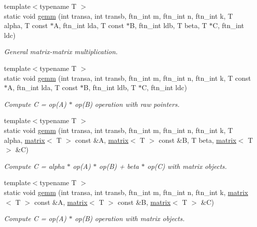 \begin{DoxyCompactItemize}
\item 
{\footnotesize template$<$typename T $>$ }\\static void \hyperlink{classsddk_1_1linalg_3_01_c_p_u_01_4_a3e069c2b48dc2a783443cb91e82efab3}{gemm} (int transa, int transb, ftn\+\_\+int m, ftn\+\_\+int n, ftn\+\_\+int k, T alpha, T const $\ast$A, ftn\+\_\+int lda, T const $\ast$B, ftn\+\_\+int ldb, T beta, T $\ast$C, ftn\+\_\+int ldc)
\begin{DoxyCompactList}\small\item\em General matrix-\/matrix multiplication. \end{DoxyCompactList}\item 
{\footnotesize template$<$typename T $>$ }\\static void \hyperlink{classsddk_1_1linalg_3_01_c_p_u_01_4_a106ecd6e4393dc46a714758ef6307f1f}{gemm} (int transa, int transb, ftn\+\_\+int m, ftn\+\_\+int n, ftn\+\_\+int k, T const $\ast$A, ftn\+\_\+int lda, T const $\ast$B, ftn\+\_\+int ldb, T $\ast$C, ftn\+\_\+int ldc)
\begin{DoxyCompactList}\small\item\em Compute C = op(\+A) $\ast$ op(\+B) operation with raw pointers. \end{DoxyCompactList}\item 
{\footnotesize template$<$typename T $>$ }\\static void \hyperlink{classsddk_1_1linalg_3_01_c_p_u_01_4_accddc5635a1bf7c595a1144f27c2545c}{gemm} (int transa, int transb, ftn\+\_\+int m, ftn\+\_\+int n, ftn\+\_\+int k, T alpha, \hyperlink{classsddk_1_1mdarray}{matrix}$<$ T $>$ const \&A, \hyperlink{classsddk_1_1mdarray}{matrix}$<$ T $>$ const \&B, T beta, \hyperlink{classsddk_1_1mdarray}{matrix}$<$ T $>$ \&C)
\begin{DoxyCompactList}\small\item\em Compute C = alpha $\ast$ op(\+A) $\ast$ op(\+B) + beta $\ast$ op(\+C) with matrix objects. \end{DoxyCompactList}\item 
{\footnotesize template$<$typename T $>$ }\\static void \hyperlink{classsddk_1_1linalg_3_01_c_p_u_01_4_adce6bfc51f9772a2ba8df05157e2850c}{gemm} (int transa, int transb, ftn\+\_\+int m, ftn\+\_\+int n, ftn\+\_\+int k, \hyperlink{classsddk_1_1mdarray}{matrix}$<$ T $>$ const \&A, \hyperlink{classsddk_1_1mdarray}{matrix}$<$ T $>$ const \&B, \hyperlink{classsddk_1_1mdarray}{matrix}$<$ T $>$ \&C)
\begin{DoxyCompactList}\small\item\em Compute C = op(\+A) $\ast$ op(\+B) operation with matrix objects. \end{DoxyCompactList}\item 

\end{DoxyCompactItemize}

